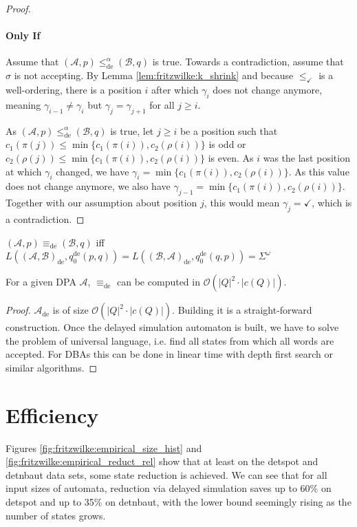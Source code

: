 \begin{proof}
	\paragraph{Only If} Assume that $(\mathcal{A}, p) \leq_\text{de}^\alpha (\mathcal{B}, q)$ is true. Towards a contradiction, assume that $\sigma$ is not accepting. By Lemma \ref{lem:fritzwilke:k_shrink} and because $\leq_\checkmark$ is a well-ordering, there is a position $i$ after which $\gamma_i$ does not change anymore, meaning $\gamma_{i-1} \neq \gamma_i$ but $\gamma_j = \gamma_{j+1}$ for all $j \geq i$.
	
	As $(\mathcal{A}, p) \leq_\text{de}^\alpha (\mathcal{B}, q)$ is true, let $j \geq i$ be a position such that $c_1(\pi(j)) \leq \min \{c_1(\pi(i)), c_2(\rho(i))\}$ is odd or $c_2(\rho(j)) \leq \min \{c_1(\pi(i)), c_2(\rho(i))\}$ is even. As $i$ was the last position at which $\gamma_i$ changed, we have $\gamma_i = \min \{c_1(\pi(i)), c_2(\rho(i))\}$. As this value does not change anymore, we also have $\gamma_{j-1} = \min \{c_1(\pi(i)), c_2(\rho(i))\}$. Together with our assumption about position $j$, this would mean $\gamma_j = \checkmark$, which is a contradiction.
\end{proof}

\begin{cor}
	$(\mathcal{A}, p) \equiv_\text{de} (\mathcal{B}, q)$ iff $L((\mathcal{A}, \mathcal{B})_\text{de}, q_0^\text{de}(p, q)) = L((\mathcal{B}, \mathcal{A})_\text{de}, q_0^\text{de}(q, p)) = \Sigma^\omega$
\end{cor}

\vspace{10pt}

\begin{theorem}
	For a given DPA $\mathcal{A}$, $\equiv_\text{de}$ can be computed in $\mathcal{O}(|Q|^2 \cdot |c(Q)|)$.
\end{theorem}

\begin{proof}
	$\mathcal{A}_\text{de}$ is of size $\mathcal{O}(|Q|^2 \cdot |c(Q)|)$. Building it is a straight-forward construction. Once the delayed simulation automaton is built, we have to solve the problem of universal language, i.e. find all states from which all words are accepted. For DBAs this can be done in linear time with depth first search or similar algorithms.
\end{proof}



\section{Efficiency}
Figures \ref{fig:fritzwilke:empirical_size_hist} and \ref{fig:fritzwilke:empirical_reduct_rel} show that at least on the \textsf{detspot} and \textsf{detnbaut} data sets, some state reduction is achieved. We can see that for all input sizes of automata, reduction via delayed simulation saves up to 60\% on \textsf{detspot} and up to 35\% on \textsf{detnbaut}, with the lower bound seemingly rising as the number of states grows.

